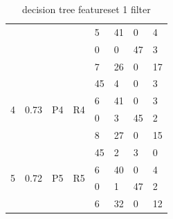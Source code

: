 \documentclass[USenglish]{ifimaster}  %
\begin{document}
\begin{table}[h]
{\begin{tabular}{@{}llllllll@{}}
\multicolumn{1}{l|}{} & \multicolumn{1}{l|}{} & \multicolumn{1}{l|}{} & \multicolumn{1}{l|}{} & \multicolumn{1}{l|}{5} & \multicolumn{1}{l|}{41} & \multicolumn{1}{l|}{0} & 4 \\ \cmidrule(l){5-8} 
\multicolumn{1}{l|}{} & \multicolumn{1}{l|}{} & \multicolumn{1}{l|}{} & \multicolumn{1}{l|}{} & \multicolumn{1}{l|}{0} & \multicolumn{1}{l|}{0} & \multicolumn{1}{l|}{47} & 3 \\ \cmidrule(l){5-8} 
\multicolumn{1}{l|}{} & \multicolumn{1}{l|}{} & \multicolumn{1}{l|}{} & \multicolumn{1}{l|}{} & \multicolumn{1}{l|}{7} & \multicolumn{1}{l|}{26} & \multicolumn{1}{l|}{0} & 17 \\ \midrule
\multicolumn{1}{l|}{\multirow{4}{*}{4}} & \multicolumn{1}{l|}{\multirow{4}{*}{0.73}} & \multicolumn{1}{l|}{\multirow{4}{*}{P4}} & \multicolumn{1}{l|}{\multirow{4}{*}{R4}} & \multicolumn{1}{l|}{45} & \multicolumn{1}{l|}{4} & \multicolumn{1}{l|}{0} & 3 \\ \cmidrule(l){5-8} 
\multicolumn{1}{l|}{} & \multicolumn{1}{l|}{} & \multicolumn{1}{l|}{} & \multicolumn{1}{l|}{} & \multicolumn{1}{l|}{6} & \multicolumn{1}{l|}{41} & \multicolumn{1}{l|}{0} & 3 \\ \cmidrule(l){5-8} 
\multicolumn{1}{l|}{} & \multicolumn{1}{l|}{} & \multicolumn{1}{l|}{} & \multicolumn{1}{l|}{} & \multicolumn{1}{l|}{0} & \multicolumn{1}{l|}{3} & \multicolumn{1}{l|}{45} & 2 \\ \cmidrule(l){5-8} 
\multicolumn{1}{l|}{} & \multicolumn{1}{l|}{} & \multicolumn{1}{l|}{} & \multicolumn{1}{l|}{} & \multicolumn{1}{l|}{8} & \multicolumn{1}{l|}{27} & \multicolumn{1}{l|}{0} & 15 \\ \midrule
\multicolumn{1}{l|}{\multirow{4}{*}{5}} & \multicolumn{1}{l|}{\multirow{4}{*}{0.72}} & \multicolumn{1}{l|}{\multirow{4}{*}{P5}} & \multicolumn{1}{l|}{\multirow{4}{*}{R5}} & \multicolumn{1}{l|}{45} & \multicolumn{1}{l|}{2} & \multicolumn{1}{l|}{3} & 0 \\ \cmidrule(l){5-8} 
\multicolumn{1}{l|}{} & \multicolumn{1}{l|}{} & \multicolumn{1}{l|}{} & \multicolumn{1}{l|}{} & \multicolumn{1}{l|}{6} & \multicolumn{1}{l|}{40} & \multicolumn{1}{l|}{0} & 4 \\ \cmidrule(l){5-8} 
\multicolumn{1}{l|}{} & \multicolumn{1}{l|}{} & \multicolumn{1}{l|}{} & \multicolumn{1}{l|}{} & \multicolumn{1}{l|}{0} & \multicolumn{1}{l|}{1} & \multicolumn{1}{l|}{47} & 2 \\ \cmidrule(l){5-8} 
\multicolumn{1}{l|}{} & \multicolumn{1}{l|}{} & \multicolumn{1}{l|}{} & \multicolumn{1}{l|}{} & \multicolumn{1}{l|}{6} & \multicolumn{1}{l|}{32} & \multicolumn{1}{l|}{0} & 12 \\ \bottomrule
\end{tabular}%
}
\caption{decision tree featureset 1 filter}
\label{dt4}
\end{table}
\FloatBarrier
\end{document}
